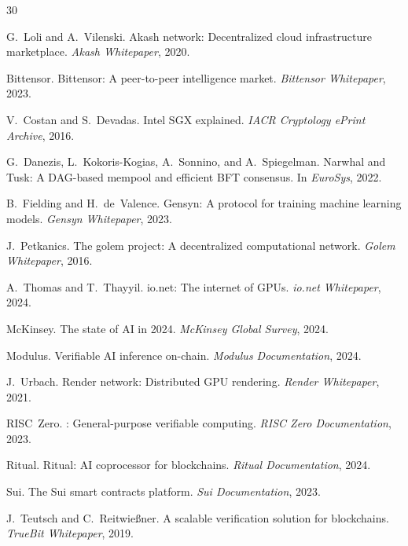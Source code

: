 \documentclass[11pt,twocolumn]{article}
\begin{document}

\begin{thebibliography}{30}

G.~Loli and A.~Vilenski.
\newblock Akash network: Decentralized cloud infrastructure marketplace.
\newblock \emph{Akash Whitepaper}, 2020.

Bittensor.
\newblock Bittensor: A peer-to-peer intelligence market.
\newblock \emph{Bittensor Whitepaper}, 2023.

V.~Costan and S.~Devadas.
\newblock Intel {SGX} explained.
\newblock \emph{IACR Cryptology ePrint Archive}, 2016.

G.~Danezis, L.~Kokoris-Kogias, A.~Sonnino, and A.~Spiegelman.
\newblock Narwhal and {Tusk}: A {DAG}-based mempool and efficient {BFT} consensus.
\newblock In \emph{EuroSys}, 2022.

B.~Fielding and H.~de~Valence.
\newblock Gensyn: A protocol for training machine learning models.
\newblock \emph{Gensyn Whitepaper}, 2023.

J.~Petkanics.
\newblock The golem project: A decentralized computational network.
\newblock \emph{Golem Whitepaper}, 2016.

A.~Thomas and T.~Thayyil.
\newblock io.net: The internet of {GPU}s.
\newblock \emph{io.net Whitepaper}, 2024.

McKinsey.
\newblock The state of {AI} in 2024.
\newblock \emph{McKinsey Global Survey}, 2024.

Modulus.
\newblock Verifiable {AI} inference on-chain.
\newblock \emph{Modulus Documentation}, 2024.

J.~Urbach.
\newblock Render network: Distributed {GPU} rendering.
\newblock \emph{Render Whitepaper}, 2021.

RISC~Zero.
: General-purpose verifiable computing.
\newblock \emph{RISC Zero Documentation}, 2023.

Ritual.
\newblock Ritual: {AI} coprocessor for blockchains.
\newblock \emph{Ritual Documentation}, 2024.

Sui.
\newblock The {Sui} smart contracts platform.
\newblock \emph{Sui Documentation}, 2023.

J.~Teutsch and C.~Reitwie{\ss}ner.
\newblock A scalable verification solution for blockchains.
\newblock \emph{TrueBit Whitepaper}, 2019.


\end{thebibliography}
\end{document}
